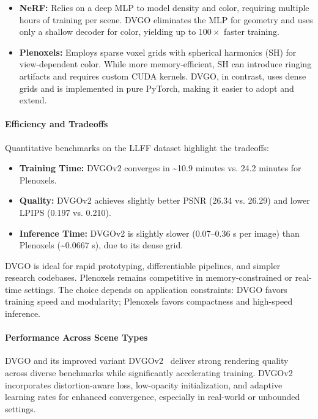 \begin{enrichment}
\begin{enrichment}
    \begin{itemize}
        \item \textbf{NeRF:} Relies on a deep MLP to model density and color, requiring multiple hours of training per scene. DVGO eliminates the MLP for geometry and uses only a shallow decoder for color, yielding up to \( 100\times \) faster training.
        
        \item \textbf{Plenoxels:} Employs sparse voxel grids with spherical harmonics (SH) for view-dependent color. While more memory-efficient, SH can introduce ringing artifacts and requires custom CUDA kernels. DVGO, in contrast, uses dense grids and is implemented in pure PyTorch, making it easier to adopt and extend.
    \end{itemize}
    
    \newpage
    
    \paragraph{Efficiency and Tradeoffs}
    
    Quantitative benchmarks on the LLFF dataset highlight the tradeoffs:
    \begin{itemize}
        \item \textbf{Training Time:} DVGOv2 converges in \textasciitilde10.9 minutes vs. 24.2 minutes for Plenoxels.
        \item \textbf{Quality:} DVGOv2 achieves slightly better PSNR (26.34 vs. 26.29) and lower LPIPS (0.197 vs. 0.210).
        \item \textbf{Inference Time:} DVGOv2 is slightly slower (0.07–0.36 s per image) than Plenoxels (\textasciitilde0.0667 s), due to its dense grid.
    \end{itemize}
    
    DVGO is ideal for rapid prototyping, differentiable pipelines, and simpler research codebases. Plenoxels remains competitive in memory-constrained or real-time settings. The choice depends on application constraints: DVGO favors training speed and modularity; Plenoxels favors compactness and high-speed inference.
    
    \paragraph{Performance Across Scene Types}
    
    DVGO and its improved variant DVGOv2~\cite{sun2022_directvoxelgridv2} deliver strong rendering quality across diverse benchmarks while significantly accelerating training. DVGOv2 incorporates distortion-aware loss, low-opacity initialization, and adaptive learning rates for enhanced convergence, especially in real-world or unbounded settings.
    

\end{enrichment}
\end{enrichment}
